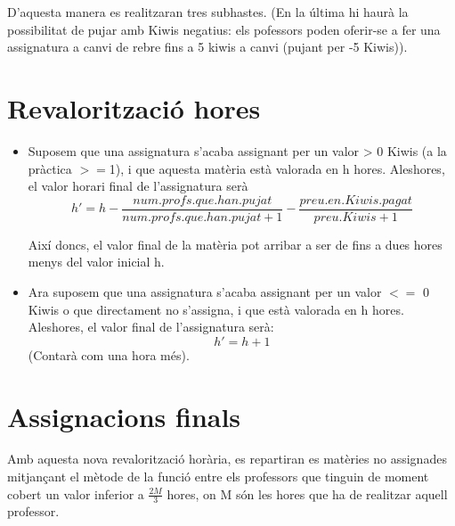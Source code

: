 \documentclass[a4paper,12pt]{article}
\begin{document}
D'aquesta manera es realitzaran tres subhastes. (En la última hi haurà la possibilitat de pujar amb Kiwis negatius: els pofessors poden oferir-se a fer una assignatura a canvi de rebre fins a 5 kiwis a canvi (pujant per -5 Kiwis)).


\section{Revalorització hores}

\begin{itemize}
    \item Suposem que una assignatura s'acaba assignant per un valor > 0 Kiwis (a la pràctica $>=$1), i que aquesta matèria està valorada en h hores. Aleshores, el valor horari final de l'assignatura serà $$ h' = h - \frac{num. profs. que. han. pujat}{num. profs. que. han. pujat + 1} - \frac{preu. en. Kiwis. pagat}{preu. Kiwis +1}$$
    
    Així doncs, el valor final de la matèria pot arribar a ser de fins a dues hores menys del valor inicial h.
    
    \item Ara suposem que una assignatura s'acaba assignant per un valor $<= $ 0 Kiwis o que directament no s'assigna, i que està valorada en h hores. Aleshores, el valor final de l'assignatura serà: $$h'= h +1 $$
    (Contarà com una hora més).
\end{itemize}

\section{Assignacions finals}

Amb aquesta nova revalorització horària, es repartiran es matèries no assignades mitjançant el mètode de la funció entre els professors que tinguin de moment cobert un valor inferior a $\frac{2M}{3}$ hores, on M són les hores que ha de realitzar aquell professor.
\end{document}
